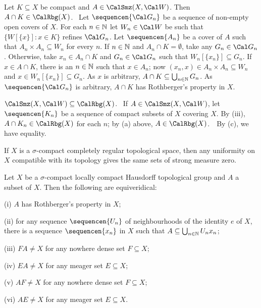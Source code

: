 {\medskip

 Let $K\subseteq X$ be compact and $A\in\CalSmz(X,\Cal W)$.
Then $A\cap K\in\CalRbg(X)$.
\Prf\ Let $\sequencen{\Cal G_n}$ be a sequence of non-empty open
covers of $X$.   For each $n\in\Bbb N$ let $W_n\in\Cal W$ be such that
$\{W[\{x\}]:x\in K\}$ refines $\Cal G_n$.   Let $\sequencen{A_n}$ be a
cover of $A$ such that $A_n\times A_n\subseteq W_n$ for every $n$.
If
$n\in\Bbb N$ and $A_n\cap K=\emptyset$, take any $G_n\in\Cal G_n$.
Otherwise, take $x_n\in A_n\cap K$ and $G_n\in\Cal G_n$ such that
$W_n[\{x_n\}]\subseteq G_n$.   If $x\in A\cap K$, there is an
$n\in\Bbb N$ such that $x\in A_n$;  now
$(x_n,x)\in A_n\times A_n\subseteq W_n$ and
$x\in W_n[\{x_n\}]\subseteq G_n$.  As $x$ is arbitrary,
$A\cap K\subseteq\bigcup_{n\in\Bbb N}G_n$.   As $\sequencen{\Cal G_n}$
is arbitrary, $A\cap K$ has Rothberger's property in $X$.\ \Qed

\medskip

 $\CalSmz(X,\Cal W)\subseteq\CalRbg(X)$.
\Prf\ If $A\in\CalSmz(X,\Cal W)$, let
$\sequencen{K_n}$ be a sequence of compact subsets of $X$ covering $X$.
By (iii), $A\cap K_n\in\CalRbg(X)$ for each $n$;
by (a) above, $A\in\CalRbg(X)$.\ \QeD\  By (c), we have equality.
}%

 If $X$ is a $\sigma$-compact completely
regular topological space, then any uniformity on $X$ compatible with
its topology gives the same sets of strong measure zero.


 Let $X$ be a $\sigma$-compact locally compact
Hausdorff topological group and $A$ a subset of $X$.   Then the
following are equiveridical:

(i) $A$ has Rothberger's property in $X$;

(ii) for any sequence $\sequencen{U_n}$ of neighbourhoods of the
identity $e$ of $X$, there is a sequence $\sequencen{x_n}$ in $X$ such
that $A\subseteq\bigcup_{n\in\Bbb N}U_nx_n$;

(iii) $FA\ne X$ for any nowhere dense set $F\subseteq X$;

(iv) $EA\ne X$ for any meager set $E\subseteq X$;

(v) $AF\ne X$ for any nowhere dense set $F\subseteq X$;

(vi) $AE\ne X$ for any meager set $E\subseteq X$.


